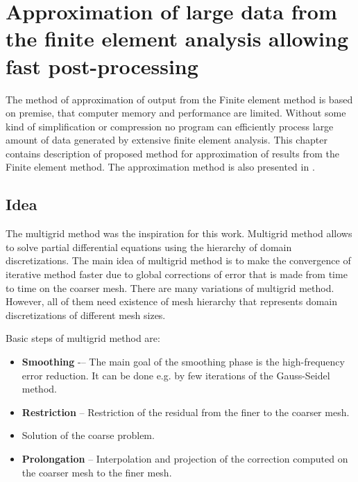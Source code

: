 \chapter{Approximation of large data from the finite element analysis allowing fast post-processing}
\label{appendix-approximation}

The method of approximation of output from the Finite element method is based on premise, that computer memory and performance are limited. Without some kind of simplification or compression no program can efficiently process large amount of data generated by extensive finite element analysis. This chapter contains description of proposed method for approximation of results from the Finite element method. The approximation method is also presented in \cite{Benes2016}.


\section{Idea}

The multigrid method \cite{XXX6-9} was the inspiration for this work. Multigrid method allows to solve partial differential equations using the hierarchy of domain discretizations. The main idea of multigrid method is to make the convergence of iterative method faster due to global corrections of error that is made from time to time on the coarser mesh. There are many variations of multigrid method. However, all of them need existence of mesh hierarchy that represents domain discretizations of different mesh sizes.

Basic steps of multigrid method are:

\begin{itemize}
    \item \textbf{Smoothing} -– The main goal of the smoothing phase is the high-frequency error reduction. It can be done e.g. by few iterations of the Gauss-Seidel method.
    \item \textbf{Restriction} -- Restriction of the residual from the finer to the coarser mesh.
    \item Solution of the coarse problem.
    \item \textbf{Prolongation} -- Interpolation and projection of the correction computed on the coarser mesh to the finer mesh.
\end{itemize}

